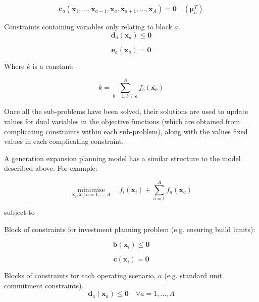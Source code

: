 \documentclass{article}
\DeclareMathOperator*{\minimise}{minimise}
\begin{document}
\begin{equation}
\bm{c}_{a}\left(\overline{\bm{x}}_{1},\ldots,\overline{\bm{x}}_{a-1},\bm{x}_{a},\overline{\bm{x}}_{a+1},\ldots,\overline{\bm{x}}_{A}\right) = \bm{0} \quad (\bm{\mu}_{a}^{T})
\end{equation}

Constraints containing variables only relating to block $a$.
\begin{equation}
\bm{d}_{a}\left(\bm{x}_{a}\right) \leq \bm{0}
\end{equation}

\begin{equation}
\bm{e}_{a}\left(\bm{x}_{a}\right) = \bm{0}
\end{equation}

Where $k$ is a constant:

\begin{equation}
	k = \sum\limits_{b=1,b \neq a}^{A} f_{b}\left(\overline{\bm{x}_{b}}\right)
\end{equation}

Once all the sub-problems have been solved, their solutions are used to update values for dual variables in the objective functions (which are obtained from complicating constraints within each sub-problem), along with the values fixed values in each complicating constraint.

A generation expansion planning model has a similar structure to the model described above. For example:

\begin{equation}
\minimise\limits_{\bm{x}_{i},\bm{x}_{a}; a=1,\ldots, A} \quad f_{i}(\bm{x}_{i}) + \sum\limits_{a=1}^{A}f_{a}(\bm{x}_{a})
\end{equation}

subject to

Block of constraints for investment planning problem (e.g. ensuring build limits):

\begin{equation}
\bm{b}\left(\bm{x}_{i}\right) \leq \bm{0}
\end{equation}

\begin{equation}
\bm{c}\left(\bm{x}_{i}\right) = \bm{0}
\end{equation}

Blocks of constraints for each operating scenario, $a$ (e.g. standard unit commitment constraints).
\begin{equation}
\bm{d}_{a}\left(\bm{x}_{a}\right) \leq \bm{0} \quad \forall a = 1,\ldots,A
\end{equation}
\end{document}
